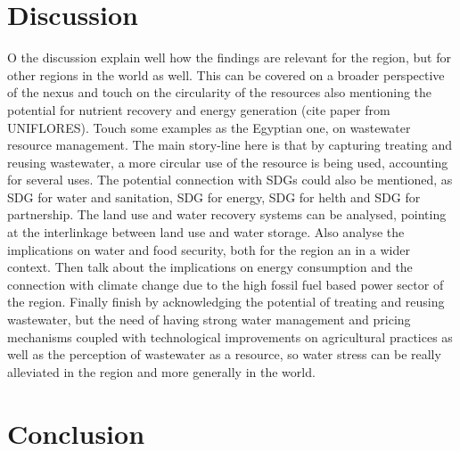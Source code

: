 \documentclass[12pt]{iopart}
\begin{document}
\section{Discussion}
O the discussion  explain well how the findings are relevant for the region, but for other regions in the world as well. This can be covered on a broader perspective of the nexus and touch on the circularity of the resources also mentioning the potential for nutrient recovery and energy generation (cite paper from UNIFLORES). Touch some examples as the Egyptian one, on wastewater resource management. The main story-line here is that by capturing treating and reusing wastewater, a more circular use of the resource is being used, accounting for several uses. The potential connection with SDGs could also be mentioned, as SDG for water and sanitation, SDG for energy, SDG for helth and SDG for partnership. The land use and water recovery systems can be analysed, pointing at the interlinkage between land use and water storage. Also analyse the implications on water and food security, both for the region an in a wider context. Then talk about the implications on energy consumption and the connection with climate change due to the high fossil fuel based power sector of the region. Finally finish by acknowledging the potential of treating and reusing wastewater, but the need of having strong water management and pricing mechanisms coupled with technological improvements on agricultural practices as well as the perception of wastewater as a resource, so water stress can be really alleviated in the region and more generally in the world. 

\section{Conclusion}

\newpage
\newcommand{\newblock}{}


\end{document}
